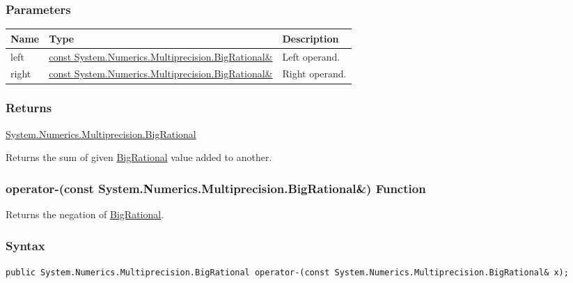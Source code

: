 \documentclass[a4paper,oneside,11.000000pt]{book}
\begin{document}
\subsubsection*{Parameters}
\begin{flushleft}
\begin{supertabular}[l]{!{\raggedright}p{1.30721cm}!{\raggedright}p{8.55945cm}!{\raggedright}p{3.66839cm}}
\textbf{Name}
& \textbf{Type}
& \textbf{Description}
\\
\hline
left
& \hyperlink{System.Numerics.Multiprecision.BigRational}{const System.\-Numerics.\-Multiprecision.\-BigRational\&\-}
& Left operand.

\\
right
& \hyperlink{System.Numerics.Multiprecision.BigRational}{const System.\-Numerics.\-Multiprecision.\-BigRational\&\-}
& Right operand.

\\
\end{supertabular}

\end{flushleft}
\subsubsection*{Returns}
\hyperlink{System.Numerics.Multiprecision.BigRational}{System.\-Numerics.\-Multiprecision.\-BigRational}
\begin{flushleft}
Returns the sum of given \hyperlink{System.Numerics.Multiprecision.BigRational}{BigRational} value added to another.

\end{flushleft}
\clearpage

\hypertarget{System.Numerics.Multiprecision.operator.minus.C.R.System.Numerics.Multiprecision.BigRational}{\subsubsection*{operator-(const System.Numerics.Multiprecision.BigRational\&) Function}}
\begin{flushleft}
Returns the negation of \hyperlink{System.Numerics.Multiprecision.BigRational}{BigRational}.

\end{flushleft}
\subsubsection*{Syntax}
\texttt{public System.Numerics.Multiprecision.BigRational operator-(const System.Numerics.Multiprecision.BigRational\& x);}
\end{document}
